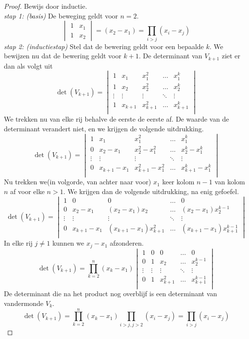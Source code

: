 \documentclass[lineaire_algebra_oplossingen.tex]{subfiles}
\begin{document}
\begin{proof}
Bewijs door inductie.\\
\emph{stap 1: (basis)}
De beweging geldt voor $n=2$.
\[
\begin{vmatrix}
1 & x_1\\
1 & x_2
\end{vmatrix}
=
(x_2-x_1) = \prod_{i>j}(x_i-x_j)
\]
\emph{stap 2: (inductiestap)}
Stel dat de bewering geldt voor een bepaalde $k$. We bewijzen nu dat de bewering geldt voor $k+1$.
De determinant van $V_{k+1}$ ziet er dan als volgt uit
\[
\det(V_{k+1}) =
\begin{vmatrix}
1 & x_1 & x_1^2 & \hdots & x_1^{k}\\
1 & x_2 & x_2^2 & \hdots & x_2^{k}\\
\vdots &\vdots &\vdots & \ddots & \vdots \\
1 & x_{k+1} & x_{k+1}^2 & \hdots & x_{k+1}^{k}\\
\end{vmatrix}
\]
We trekken nu van elke rij behalve de eerste de eerste af. De waarde van de determinant verandert niet, en we krijgen de volgende uitdrukking.
\[
\det(V_{k+1}) =
\begin{vmatrix}
1 & x_1 & x_1^2 & \hdots & x_1^{k}\\
0 & x_2-x_1 & x_2^2-x_1^2 & \hdots & x_2^{k}-x_1^{k}\\
\vdots &\vdots &\vdots & \ddots & \vdots \\
0 & x_{k+1}-x_1 & x_{k+1}^2-x_1^2  & \hdots & x_{k+1}^{k}-x_1^{k}\\
\end{vmatrix}
\]
Nu trekken we(in volgorde, van achter naar voor) $x_1$ keer kolom $n-1$ van kolom $n$ af voor elke $n > 1$. We krijgen dan de volgende uitdrukking, na enig gefoefel.
\[
\det(V_{k+1}) =
\begin{vmatrix}
1 & 0 & 0 & \hdots & 0\\
0 & x_2-x_1 & (x_2-x_1)x_2 & \hdots & (x_2-x_1)x_2^{k-1}\\
\vdots &\vdots &\vdots & \ddots & \vdots \\
0 & x_{k+1}-x_1 & (x_{k+1}-x_1)x_{k+1}^2  & \hdots & (x_{k+1}-x_1)x_{k+1}^{k-1}\\
\end{vmatrix}
\]
In elke rij $j \neq 1$ kunnen we $x_j-x_1$ afzonderen.
\[
\det(V_{k+1}) =
\prod_{k=2}^n(x_k-x_1)
\begin{vmatrix}
1 & 0 & 0 & \hdots & 0\\
0 & 1 & x_2 & \hdots & x_2^{k-1}\\
\vdots &\vdots &\vdots & \ddots & \vdots \\
0 & 1 & x_{k+1}^2  & \hdots & x_{k+1}^{k-1}\\
\end{vmatrix}
\]
De determinant die na het product nog overblijf is een determinant van vandermonde $V_k$.
\[
\det(V_{k+1}) =
\prod_{k=2}^n(x_k-x_1)
\prod_{i>j,j>2}(x_i-x_j)
= \prod_{i>j}(x_i-x_j)
\]
\end{proof}
\end{document}
